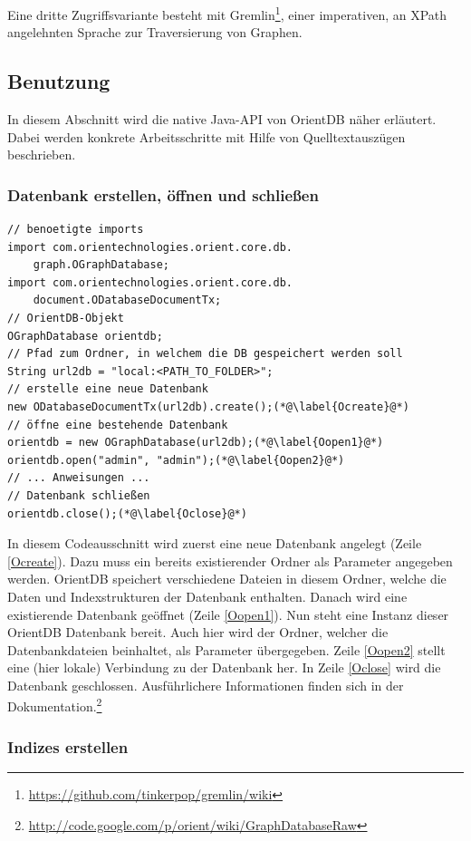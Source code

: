 \documentclass[11pt, a4paper, oneside]{article} %
\begin{document}
Eine dritte Zugriffsvariante besteht mit  Gremlin\footnote{\url{https://github.com/tinkerpop/gremlin/wiki}}, einer imperativen, an XPath angelehnten Sprache zur Traversierung von Graphen.

\subsection{Benutzung}

In diesem Abschnitt wird die native Java-API von OrientDB näher erläutert. Dabei werden konkrete Arbeitsschritte mit Hilfe von Quelltextauszügen beschrieben.

\subsubsection{Datenbank erstellen, öffnen und schließen}
\begin{lstlisting}[caption={OrientDB - Datenbank erstellen, öffnen und schließen}]
// benoetigte imports
import com.orientechnologies.orient.core.db.
	graph.OGraphDatabase;
import com.orientechnologies.orient.core.db.
	document.ODatabaseDocumentTx;
// OrientDB-Objekt
OGraphDatabase orientdb;
// Pfad zum Ordner, in welchem die DB gespeichert werden soll
String url2db = "local:<PATH_TO_FOLDER>";
// erstelle eine neue Datenbank
new ODatabaseDocumentTx(url2db).create();(*@\label{Ocreate}@*)
// öffne eine bestehende Datenbank
orientdb = new OGraphDatabase(url2db);(*@\label{Oopen1}@*)
orientdb.open("admin", "admin");(*@\label{Oopen2}@*)
// ... Anweisungen ...
// Datenbank schließen
orientdb.close();(*@\label{Oclose}@*)
\end{lstlisting}

In diesem Codeausschnitt wird zuerst eine neue Datenbank angelegt (Zeile \ref{Ocreate}). Dazu muss ein bereits existierender Ordner als Parameter angegeben werden. OrientDB speichert verschiedene Dateien in diesem Ordner, welche die Daten und Indexstrukturen der Datenbank enthalten. Danach wird eine existierende Datenbank geöffnet (Zeile \ref{Oopen1}). Nun steht eine Instanz dieser OrientDB Datenbank bereit. Auch hier wird der Ordner, welcher die Datenbankdateien beinhaltet, als Parameter übergegeben. Zeile \ref{Oopen2} stellt eine (hier lokale) Verbindung zu der Datenbank her. In Zeile \ref{Oclose} wird die Datenbank geschlossen.
Ausführlichere Informationen finden sich in der Dokumentation.\footnote{\url{http://code.google.com/p/orient/wiki/GraphDatabaseRaw}}

\subsubsection{Indizes erstellen}
\end{document}
